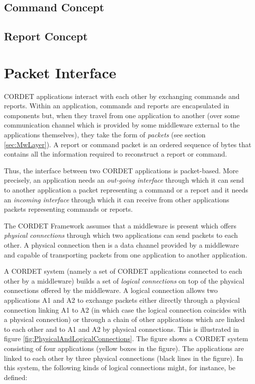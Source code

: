 \documentclass[a4paper,10pt]{article}
\let\stdsection\section
\renewcommand\section{\newpage\stdsection}
\begin{document}
\subsection{Command Concept }\label{sec:CmdConcept}


\subsection{Report Concept }\label{sec:RepConcept}



\clearpage
\section{Packet Interface}\label{sec:PcktInterface}

CORDET applications interact with each other by exchanging commands and reports. Within an application, commands and reports are encapsulated in components but, when they travel from one application to another (over some communication channel which is provided by some middleware external to the applications themselves), they take the form of \textit{packets} (see section \ref{sec:MwLayer}). A report or command packet is an ordered sequence of bytes that contains all the information required to reconstruct a report or command. 

Thus, the interface between two CORDET applications is packet-based. More precisely, an application needs an \textit{out-going interface} through which it can send to another application a packet representing a command or a report and it needs an \textit{incoming interface} through which it can receive from other applications packets representing commands or reports.  

The CORDET Framework assumes that a middleware is present which offers \textit{physical connections} through which two applications can send packets to each other. A physical connection then is a data channel provided by a middleware and capable of transporting packets from one application to another application. 

A CORDET system (namely a set of CORDET applications connected to each other by a middleware) builds a set of \textit{logical connections} on top of the physical connections offered by the middleware. A logical connection allows two applications A1 and A2 to exchange packets either directly through a physical connection linking A1 to A2 (in which case the logical connection coincides with a physical connection) or through a chain of other applications which are linked to each other and to A1 and A2 by physical connections. This is illustrated in figure \ref{fig:PhysicalAndLogicalConnections}. The figure shows a CORDET system consisting of four applications (yellow boxes in the figure). The applications are linked to each other by three physical connections (black lines in the figure). In this system, the following kinds of logical connections might, for instance, be defined:
\end{document}
